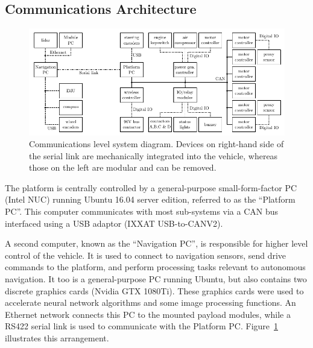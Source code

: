 \documentclass[preprint,authoryear,12pt]{elsarticle}
\begin{document}
    \subsection{Communications Architecture}
    \label{sect:architecture}

        \begin{figure}[htb]
            \centering
            \includegraphics[width=\linewidth]{images/diagram_v5.pdf}
            \caption{
                Communications level system diagram.
                Devices on right-hand side of the serial link are mechanically integrated into the vehicle, whereas those on the left are modular and can be removed.
            }
            \label{fig:system_diagram}
        \end{figure}

        The platform is centrally controlled by a general-purpose small-form-factor PC (Intel NUC) running Ubuntu 16.04 server edition, referred to as the ``Platform PC''.
        This computer communicates with most sub-systems via a CAN bus interfaced using a USB adaptor (IXXAT USB-to-CANV2).

        A second computer, known as the ``Navigation PC'', is responsible for higher level control of the vehicle.
        It is used to connect to navigation sensors, send drive commands to the platform, and perform processing tasks relevant to autonomous navigation.
        It too is a general-purpose PC running Ubuntu, but also contains two discrete graphics cards (Nvidia GTX 1080Ti).
        These graphics cards were used to accelerate neural network algorithms and some image processing functions.
        An Ethernet network connects this PC to the mounted payload modules, while a RS422 serial link is used to communicate with the Platform PC.
        Figure~\ref{fig:system_diagram} illustrates this arrangement.
\end{document}
